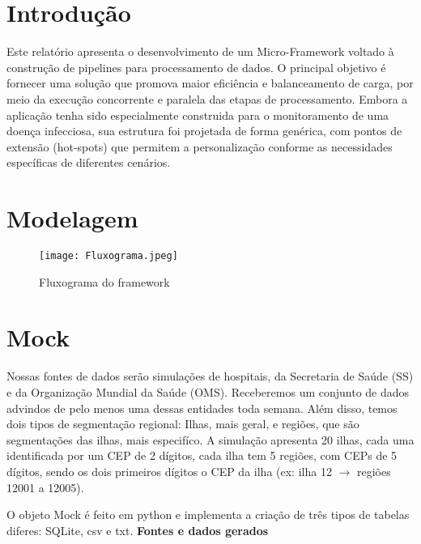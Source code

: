 \documentclass[a4paper,12pt]{article}
\begin{document}
\tableofcontents
\newpage


\section{Introdução}
Este relatório apresenta o desenvolvimento de um Micro-Framework voltado à construção de pipelines para processamento de dados. O principal objetivo é fornecer uma solução que promova maior eficiência e balanceamento de carga, por meio da execução concorrente e paralela das etapas de processamento. Embora a aplicação tenha sido especialmente construida para o monitoramento de uma doença infecciosa, sua estrutura foi projetada de forma genérica, com pontos de extensão (hot-spots) que permitem a personalização conforme as necessidades específicas de diferentes cenários.

\section{Modelagem}

\begin{figure}[H]
    \hspace{-1cm}
    \texttt{[image: Fluxograma.jpeg]}
    \caption{Fluxograma do framework}
    \label{fig:minha_imagem}
\end{figure}

\section{Mock}

Nossas fontes de dados serão simulações de hospitais, da Secretaria de Saúde (SS) e da Organização Mundial da Saúde (OMS). Receberemos um conjunto de dados advindos de pelo menos uma dessas entidades toda semana. Além disso, temos dois tipos de segmentação regional: Ilhas, mais geral, e regiões, que são segmentações das ilhas, mais especifíco. A simulação apresenta 20 ilhas, cada uma identificada por um CEP de 2 dígitos, cada ilha tem 5 regiões, com CEPs de 5 dígitos, sendo os dois primeiros dígitos o CEP da ilha (ex: ilha 12 $\rightarrow$ regiões 12001 a 12005).

O objeto Mock é feito em python e implementa a criação de três tipos de tabelas diferes: SQLite, csv e txt.
\vspace{0.5cm}
\textbf{Fontes e dados gerados}
\end{document}
